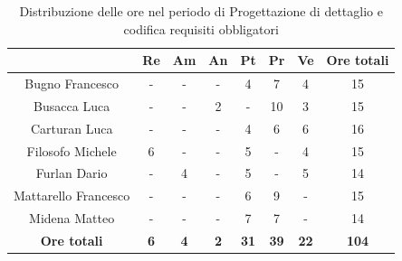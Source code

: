 \begin{table}[H]
  \centering
  \renewcommand{\arraystretch}{1.8}
  \begin{tabular}{c|c|c|c|c|c|c|c}
    \rowcolor[HTML]{125E28}
    \multicolumn{1}{c}{\color[HTML]{FFFFFF}\textbf{ Nominativo }}
                         & \multicolumn{1}{c}{\color[HTML]{FFFFFF}\textbf{ Re }}
                         & \multicolumn{1}{c}{\color[HTML]{FFFFFF}\textbf{ Am}}
                         & \multicolumn{1}{c}{\color[HTML]{FFFFFF}\textbf{ An }}
                         & \multicolumn{1}{c}{\color[HTML]{FFFFFF}\textbf{ Pt }}
                         & \multicolumn{1}{c}{\color[HTML]{FFFFFF}\textbf{ Pr }}
                         & \multicolumn{1}{c}{\color[HTML]{FFFFFF}\textbf{ Ve }}
                         & \multicolumn{1}{c}{\color[HTML]{FFFFFF}\textbf{ Ore totali }}                                                                                    \\
    \hline
    Bugno Francesco      & -                                                             & -          & -          & 4           & 7           & 4           & 15           \\
    Busacca Luca         & -                                                             & -          & 2          & -           & 10          & 3           & 15           \\
    Carturan Luca        & -                                                             & -          & -          & 4           & 6           & 6           & 16           \\
    Filosofo Michele     & 6                                                             & -          & -          & 5           & -           & 4           & 15           \\
    Furlan Dario         & -                                                             & 4          & -          & 5           & -           & 5           & 14           \\
    Mattarello Francesco & -                                                             & -          & -          & 6           & 9           & -           & 15           \\
    Midena Matteo        & -                                                             & -          & -          & 7           & 7           & -           & 14           \\
    \textbf{Ore totali}  & \textbf{6}                                                    & \textbf{4} & \textbf{2} & \textbf{31} & \textbf{39} & \textbf{22} & \textbf{104}
  \end{tabular}
  \caption{Distribuzione delle ore nel periodo di Progettazione di dettaglio e codifica requisiti obbligatori}
\end{table}

